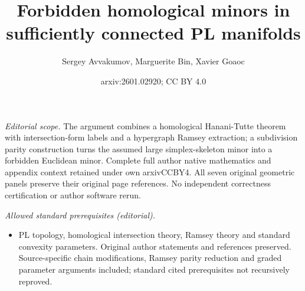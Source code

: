 \documentclass[11pt]{article}
\title{Forbidden homological minors in sufficiently connected PL manifolds}
\author{Sergey Avvakumov, Marguerite Bin, Xavier Goaoc}
\date{arxiv:2601.02920; CC BY 4.0}
\begin{document}
\maketitle
\noindent\textit{Editorial scope.} The argument combines a homological Hanani-Tutte theorem with intersection-form labels and a hypergraph Ramsey extraction; a subdivision parity construction turns the assumed large simplex-skeleton minor into a forbidden Euclidean minor. Complete full author native mathematics and appendix context retained under own arxivCCBY4. All seven original geometric panels preserve their original page references. No independent correctness certification or author software rerun.\par\medskip
\noindent\textit{Allowed standard prerequisites (editorial).}\begin{itemize}
\item PL topology, homological intersection theory, Ramsey theory and standard convexity parameters. Original author statements and references preserved. Source-specific chain modifications, Ramsey parity reduction and graded parameter arguments included; standard cited prerequisites not recursively reproved.
\end{itemize}\medskip
\end{document}
